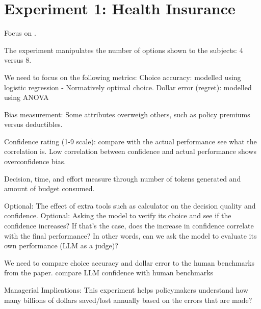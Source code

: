 \section{Experiment 1: Health Insurance}

Focus on \citet{johnson2013can}.

The experiment manipulates the number of options shown to the subjects: 4 versus 8.

We need to focus on the following metrics:
Choice accuracy: modelled using logistic regression - Normatively optimal choice.
Dollar error (regret): modelled using ANOVA

Bias measurement:
Some attributes overweigh others, such as policy premiums versus deductibles.

Confidence rating (1-9 scale): 
compare with the actual performance see what the correlation is.
Low correlation between confidence and actual performance shows overconfidence bias.

Decision, time, and effort measure through number of tokens generated and amount of budget consumed.

Optional: The effect of extra tools such as calculator on the decision quality and confidence.
Optional: Asking the model to verify its choice and see if the confidence increases? If that's the case, does the increase in confidence correlate with the final performance?
In other words, can we ask the model to evaluate its own performance (LLM as a judge)?


We need to compare choice accuracy and dollar error to the human benchmarks from the paper.
compare LLM confidence with human benchmarks 


Managerial Implications: This experiment helps policymakers understand how many billions of dollars saved/lost annually based on the errors that are made?